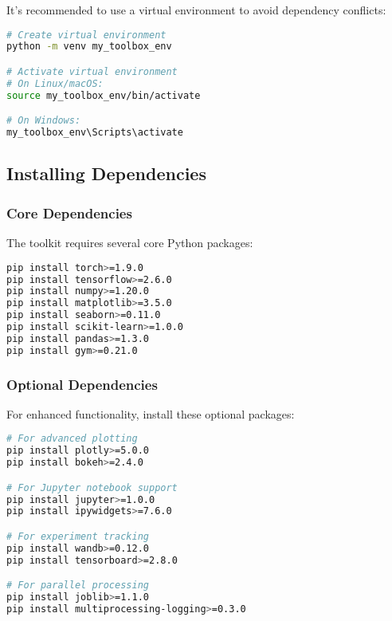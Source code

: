 It's recommended to use a virtual environment to avoid dependency conflicts:

\begin{lstlisting}[language=bash, caption=Creating virtual environment]
# Create virtual environment
python -m venv my_toolbox_env

# Activate virtual environment
# On Linux/macOS:
source my_toolbox_env/bin/activate

# On Windows:
my_toolbox_env\Scripts\activate
\end{lstlisting}

\subsection{Installing Dependencies}

\subsubsection{Core Dependencies}

The toolkit requires several core Python packages:

\begin{lstlisting}[language=bash, caption=Installing core dependencies]
pip install torch>=1.9.0
pip install tensorflow>=2.6.0
pip install numpy>=1.20.0
pip install matplotlib>=3.5.0
pip install seaborn>=0.11.0
pip install scikit-learn>=1.0.0
pip install pandas>=1.3.0
pip install gym>=0.21.0
\end{lstlisting}

\subsubsection{Optional Dependencies}

For enhanced functionality, install these optional packages:

\begin{lstlisting}[language=bash, caption=Installing optional dependencies]
# For advanced plotting
pip install plotly>=5.0.0
pip install bokeh>=2.4.0

# For Jupyter notebook support
pip install jupyter>=1.0.0
pip install ipywidgets>=7.6.0

# For experiment tracking
pip install wandb>=0.12.0
pip install tensorboard>=2.8.0

# For parallel processing
pip install joblib>=1.1.0
pip install multiprocessing-logging>=0.3.0
\end{lstlisting}

